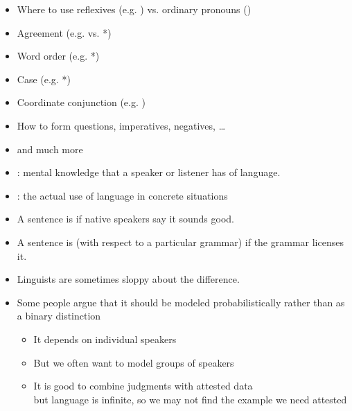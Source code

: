 \documentclass[a4paper,landscape,headrule,footrule]{foils}
\begin{document}
\MyLogo{}
\begin{itemize}
\item Where to use reflexives (e.g. ) vs. ordinary
pronouns ()
\item Agreement (e.g.  vs. *)
\item Word order (e.g. *)
\item Case (e.g. *)
\item Coordinate conjunction (e.g. )
\item How to form questions, imperatives, negatives, \ldots 
\item[\ldots] and much more
\end{itemize}

\begin{itemize}
\item {}:  mental knowledge that a speaker or listener has of language.
\item {}: the actual use of language in concrete situations
\end{itemize}

\begin{exe}
\ex  {}
\ex  {}
\ex  {}
\ex  {}
\vspace*{2ex}
\ex  {}
\ex  {}
\ex  {}
\end{exe}


\begin{itemize}
\item A sentence is  if native speakers
say it sounds good.

\item A sentence is  (with respect to
a particular grammar) if the grammar
licenses it.

\item Linguists are sometimes sloppy about the
difference.

\item Some people argue that it should be modeled probabilistically
  rather than as a binary distinction
  \begin{itemize}
  \item It depends on individual speakers
  \item But we often want to model groups of speakers
  \item It is good to combine judgments with attested data
    \\ but language is infinite, so we may not find the example we need attested
  \end{itemize}
\end{itemize}
\end{document}
